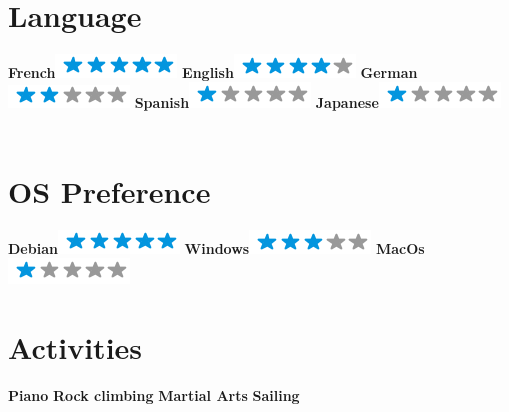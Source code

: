 \begin{aside}
  ~
  \makecvsideheader%
  \section{Language}
    \textbf{French}\includegraphics[scale=0.40]{img/5stars.png}
    \textbf{English}\includegraphics[scale=0.40]{img/4stars.png}
    \textbf{German}\includegraphics[scale=0.40]{img/2stars.png}
    \textbf{Spanish}\includegraphics[scale=0.40]{img/1stars.png}
    \textbf{Japanese}\includegraphics[scale=0.40]{img/1stars.png}
  ~
  \section{OS Preference}
    \textbf{Debian}\includegraphics[scale=0.40]{img/5stars.png}
    \textbf{Windows}\includegraphics[scale=0.40]{img/3stars.png}
    \textbf{MacOs}\includegraphics[scale=0.40]{img/1stars.png}
  ~
  \section{Activities}
    \textbf{Piano}
    \textbf{Rock climbing}
    \textbf{Martial Arts}
    \textbf{Sailing}
\end{aside}